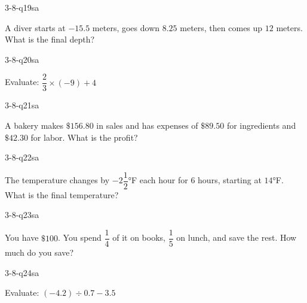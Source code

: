 \begin{practiceQuestion}{3-8-q19}{sa}
\begin{questionText}
A diver starts at $-15.5$ meters, goes down $8.25$ meters, then comes up $12$ meters. What is the final depth?
\end{questionText}
\end{practiceQuestion}

\begin{practiceQuestion}{3-8-q20}{sa}
\begin{questionText}
Evaluate: $\dfrac{2}{3} \times (-9) + 4$
\end{questionText}
\end{practiceQuestion}

\begin{practiceQuestion}{3-8-q21}{sa}
\begin{questionText}
A bakery makes $\$156.80$ in sales and has expenses of $\$89.50$ for ingredients and $\$42.30$ for labor. What is the profit?
\end{questionText}
\end{practiceQuestion}

\begin{practiceQuestion}{3-8-q22}{sa}
\begin{questionText}
The temperature changes by $-2\dfrac{1}{2}°$F each hour for $6$ hours, starting at $14°$F. What is the final temperature?
\end{questionText}
\end{practiceQuestion}

\begin{practiceQuestion}{3-8-q23}{sa}
\begin{questionText}
You have $\$100$. You spend $\dfrac{1}{4}$ of it on books, $\dfrac{1}{5}$ on lunch, and save the rest. How much do you save?
\end{questionText}
\end{practiceQuestion}

\begin{practiceQuestion}{3-8-q24}{sa}
\begin{questionText}
Evaluate: $(-4.2) \div 0.7 - 3.5$
\end{questionText}
\end{practiceQuestion}

